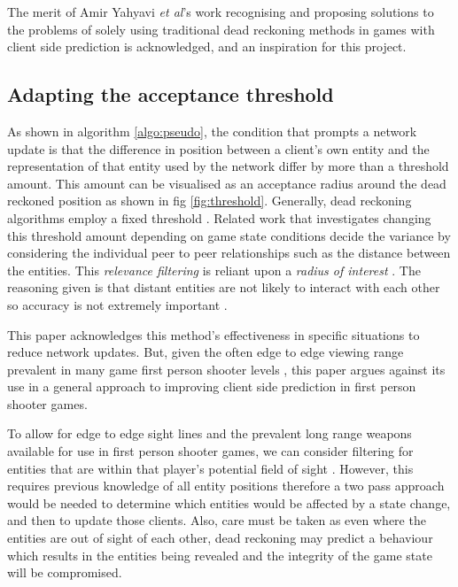 \documentclass[journal]{IEEEtran}
\begin{document}
The merit of Amir Yahyavi \textit{et al}'s work \cite{yahyavi2011antreckoning} \cite{yahyavi2013interest} recognising and proposing solutions to the problems of solely using traditional dead reckoning methods in games with client side prediction is acknowledged, and an inspiration for this project.

\subsection{Adapting the acceptance threshold}

As shown in algorithm \ref{algo:pseudo}, the condition that prompts a network update is that the difference in position between a client's own entity and the representation of that entity used by the network differ by more than a threshold amount. This amount can be visualised as an acceptance radius around the dead reckoned position as shown in fig \ref{fig:threshold}. Generally, dead reckoning algorithms employ a fixed threshold \cite{cai1999auto}. Related work that investigates changing this threshold amount depending on game state conditions decide the variance by considering the individual peer to peer relationships such as the distance between the entities. This \textit{relevance filtering} is reliant upon a \textit{radius of interest} \cite{rak1996evaluation}. The reasoning given is that distant entities are not likely to interact with each other so accuracy is not extremely important  \cite{cai1999auto} \cite{jaya2016combining}.

This paper acknowledges this method's effectiveness in specific situations to reduce network updates. But, given the often edge to edge viewing range prevalent in many game first person shooter levels \cite{toby2014tobyscs} \cite{ziervogel2014nag} \cite{cod2018wikibo4}, this paper argues against its use in a general approach to improving client side prediction in first person shooter games.

To allow for edge to edge sight lines and the prevalent long range weapons available for use in first person shooter games, we can consider filtering for entities that are within that player’s potential field of sight \cite{cronin2001distributed}. However, this requires previous knowledge of all entity positions therefore a two pass approach would be needed to determine which entities would be affected by a state change, and then to update those clients. Also, care must be taken as even where the entities are out of sight of each other, dead reckoning may predict a behaviour which results in the entities being revealed and the integrity of the game state will be compromised.
\end{document}
